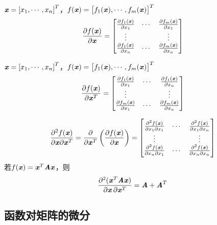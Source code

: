 \begin{definition}
    $\boldsymbol{\mathit{x}} = \left[x_1, \cdots, x_n \right]^T$，$f(\boldsymbol{\mathit{x}}) = \left[f_1(\boldsymbol{\mathit{x}}), \cdots, f_m(\boldsymbol{\mathit{x}}) \right]^T$
    \[
        \frac{\partial f(\boldsymbol{\mathit{x}})}{\partial \boldsymbol{\mathit{x}}} = \begin{bmatrix}
            \frac{\partial f_1(\boldsymbol{\mathit{x}})}{\partial x_1}  & \cdots & \frac{\partial f_m(\boldsymbol{\mathit{x}})}{\partial x_1} \\
            \vdots & & \vdots \\
            \frac{\partial f_1(\boldsymbol{\mathit{x}})}{\partial x_n}  & \cdots & \frac{\partial f_m(\boldsymbol{\mathit{x}})}{\partial x_n}
        \end{bmatrix}
    \]
\end{definition}

\begin{definition}[Jacobi矩阵]
    $\boldsymbol{\mathit{x}} = \left[x_1, \cdots, x_n \right]^T$，$f(\boldsymbol{\mathit{x}}) = \left[f_1(\boldsymbol{\mathit{x}}), \cdots, f_m(\boldsymbol{\mathit{x}}) \right]^T$
    \[
        \frac{\partial f(\boldsymbol{\mathit{x}})}{\partial \boldsymbol{\mathit{x}}^T} = \begin{bmatrix}
            \frac{\partial f_1(\boldsymbol{\mathit{x}})}{\partial x_1}  & \cdots & \frac{\partial f_1(\boldsymbol{\mathit{x}})}{\partial x_n} \\
            \vdots & & \vdots \\
            \frac{\partial f_m(\boldsymbol{\mathit{x}})}{\partial x_1}  & \cdots & \frac{\partial f_m(\boldsymbol{\mathit{x}})}{\partial x_n}
        \end{bmatrix}
    \]
\end{definition}


\begin{definition}[Hessian矩阵]
    \[
        \frac{\partial^2 f(\boldsymbol{\mathit{x}})}{\partial \boldsymbol{\mathit{x}} \partial \boldsymbol{\mathit{x}}^T } = \frac{\partial}{\partial \boldsymbol{\mathit{x}}^T} \left(\frac{\partial f(\boldsymbol{\mathit{x}})}{\partial \boldsymbol{\mathit{x}}} \right) = \begin{bmatrix}
            \frac{\partial^2 f(\boldsymbol{\mathit{x}})}{\partial x_1 \partial x_1} &  \cdots & \frac{\partial^2 f(\boldsymbol{\mathit{x}})}{\partial x_1 \partial x_n} \\
            \vdots & & \vdots \\
            \frac{\partial^2 f(\boldsymbol{\mathit{x}})}{\partial x_n \partial x_1} &  \cdots & \frac{\partial^2 f(\boldsymbol{\mathit{x}})}{\partial x_n \partial x_n}
        \end{bmatrix}
    \]
    若$f(\boldsymbol{\mathit{x}}) = \boldsymbol{\mathit{x}}^T\boldsymbol{\mathit{A}}\boldsymbol{\mathit{x}}$，则
    \[
        \frac{\partial^2(\boldsymbol{\mathit{x}}^T\boldsymbol{\mathit{A}}\boldsymbol{\mathit{x}})}{\partial \boldsymbol{\mathit{x}} \, \partial \boldsymbol{\mathit{x}}^T} = \boldsymbol{\mathit{A}} + \boldsymbol{\mathit{A}}^T
    \]
\end{definition}

\subsection{函数对矩阵的微分}
\label{sub:函数对矩阵的微分}

